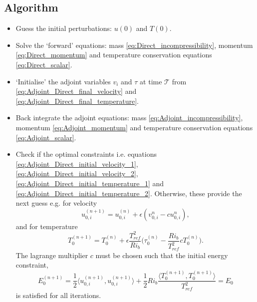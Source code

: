 \documentclass[preprint,12pt]{article}
\begin{document}
\subsection{Algorithm}
\begin{tcolorbox}
\begin{itemize}
	\item Guess the initial perturbations: $u(0)$ and $T(0)$.
	\item Solve the `forward' equations: mass \eqref{eq:Direct_incompressibility}, momentum \eqref{eq:Direct_momentum} and temperature conservation equations \eqref{eq:Direct_scalar}.
	\item `Initialise' the adjoint variables $v_i$ and $\tau$ at time $\mathcal{T}$ from \eqref{eq:Adjoint_Direct_final_velocity} and \eqref{eq:Adjoint_Direct_final_temperature}.\\
	\item Back integrate the adjoint equations: mass \eqref{eq:Adjoint_incompressibility}, momentum \eqref{eq:Adjoint_momentum} and temperature conservation equations \eqref{eq:Adjoint_scalar}.
	\item Check if the optimal constraints i.e. equations \eqref{eq:Adjoint_Direct_initial_velocity_1}, \eqref{eq:Adjoint_Direct_initial_velocity_2}, \eqref{eq:Adjoint_Direct_initial_temperature_1} and \eqref{eq:Adjoint_Direct_initial_temperature_2}. Otherwise, these provide the next guess e.g. for velocity
	\begin{equation}
	u_{0,i}^{(n+1)}=u_{0,i}^{(n)}+{\epsilon}(v_{0,i}^{n}-cu_{0,i}^{n}),
	\end{equation}
	and for temperature
	\begin{equation}
	T_{0}^{(n+1)}=T_{0}^{(n)}+{\epsilon}\frac{T_{ref}^2}{Ri_b}\bigg(\tau_{0}^{(n)}-\frac{Ri_b}{T_{ref}^2}cT_{0}^{(n)}\bigg).
	\end{equation}
	The lagrange multiplier $c$ must be chosen such that the initial energy constraint,
	\begin{equation}
	E_0^{(n+1)}=\frac{1}{2}\Big\langle u_{0,i}^{(n+1)},u_{0,i}^{(n+1)}\Big\rangle+\frac{1}{2}Ri_b \frac{\langle T_{0}^{(n+1)},T_{0}^{(n+1)}\rangle}{T_{ref}^2}=E_0
	\end{equation}
	is satisfied for all iterations.
\end{itemize}
\end{tcolorbox}
\end{document}
